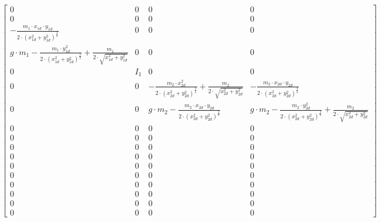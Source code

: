 $$\left[\begin{matrix}0 & 0 & 0 & 0\\0 & 0 & 0 & 0\\- \frac{m_{1} \cdot x_{1 d} \cdot y_{1 d}}{2 \cdot \left(x_{1 d}^{2} + y_{1 d}^{2}\right)^{\frac{3}{2}}} & 0 & 0 & 0\\g \cdot m_{1} - \frac{m_{1} \cdot y_{1 d}^{2}}{2 \cdot \left(x_{1 d}^{2} + y_{1 d}^{2}\right)^{\frac{3}{2}}} + \frac{m_{1}}{2 \cdot \sqrt{x_{1 d}^{2} + y_{1 d}^{2}}} & 0 & 0 & 0\\0 & I_{1} & 0 & 0\\0 & 0 & - \frac{m_{2} \cdot x_{2 d}^{2}}{2 \cdot \left(x_{2 d}^{2} + y_{2 d}^{2}\right)^{\frac{3}{2}}} + \frac{m_{2}}{2 \cdot \sqrt{x_{2 d}^{2} + y_{2 d}^{2}}} & - \frac{m_{2} \cdot x_{2 d} \cdot y_{2 d}}{2 \cdot \left(x_{2 d}^{2} + y_{2 d}^{2}\right)^{\frac{3}{2}}}\\0 & 0 & g \cdot m_{2} - \frac{m_{2} \cdot x_{2 d} \cdot y_{2 d}}{2 \cdot \left(x_{2 d}^{2} + y_{2 d}^{2}\right)^{\frac{3}{2}}} & g \cdot m_{2} - \frac{m_{2} \cdot y_{2 d}^{2}}{2 \cdot \left(x_{2 d}^{2} + y_{2 d}^{2}\right)^{\frac{3}{2}}} + \frac{m_{2}}{2 \cdot \sqrt{x_{2 d}^{2} + y_{2 d}^{2}}}\\0 & 0 & 0 & 0\\0 & 0 & 0 & 0\\0 & 0 & 0 & 0\\0 & 0 & 0 & 0\\0 & 0 & 0 & 0\\0 & 0 & 0 & 0\\0 & 0 & 0 & 0\\0 & 0 & 0 & 0\\0 & 0 & 0 & 0\\0 & 0 & 0 & 0\end{matrix}\right]$$


